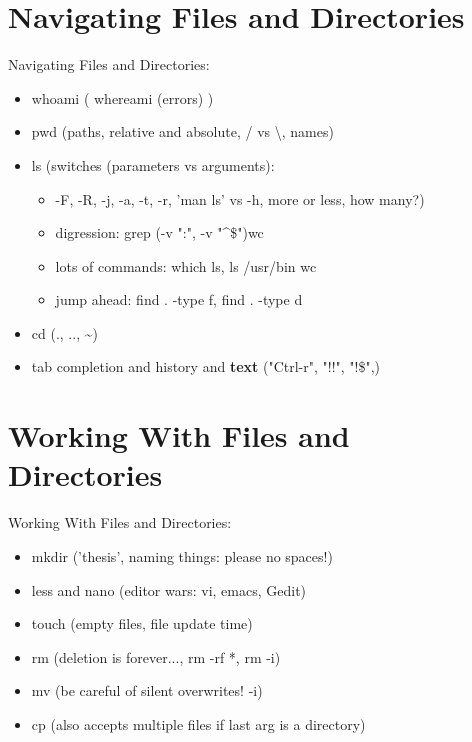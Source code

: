 \documentclass[
 size=12pt,
 paper=screen,
 mode=present,
 display=slidesnotes,
 style=paintings,
 nohandoutpagebreaks,
]{powerdot}
\begin{document}
\section[slide=false]{Navigating Files and Directories}

\begin{slide}{Navigating Files and Directories:}
  \begin{itemize}
     \item whoami ( whereami (errors) )
     \item pwd (paths, relative and absolute, / vs \textbackslash, names)
     \item ls (switches (parameters vs arguments):
        \begin{itemize}
           \item -F, -R, -j, -a, -t, -r, 'man ls' vs -h, \textbar more or less, how many?)
           \item digression: grep (-v ":", -v "\textasciicircum\$")\textbar wc
           \item lots of commands: which ls, ls /usr/bin \textbar wc
           \item jump ahead: find . -type f, find . -type d
        \end{itemize}
     \item cd (., .., \textasciitilde)
     \item tab completion and history and \textbf{text} ("Ctrl-r", "!!", "!\$",)
  \end{itemize}
\end{slide}

\section[slide=false]{Working With Files and Directories}

\begin{slide}{Working With Files and Directories:}
  \begin{itemize}
     \item mkdir ('thesis', naming things: please no spaces!)
     \item less and nano (editor wars: vi, emacs, Gedit)
     \item touch (empty files, file update time)
     \item rm (deletion is forever..., rm -rf *, rm -i)
     \item mv (be careful of silent overwrites! -i)
     \item cp (also accepts multiple files if last arg is a directory)
  \end{itemize}
\end{slide}
\end{document}
